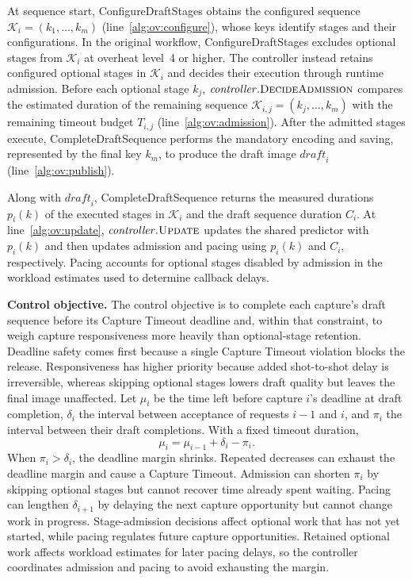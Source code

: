 

At sequence start, \textsf{ConfigureDraftStages} obtains the configured sequence \(\mathcal K_i=(k_1,\ldots,k_m)\) (line~\ref{alg:ov:configure}), whose keys identify stages and their configurations.
In the original workflow, \textsf{ConfigureDraftStages} excludes optional stages from \(\mathcal K_i\) at overheat level~4 or higher.
The controller instead retains configured optional stages in \(\mathcal K_i\) and decides their execution through runtime admission.
Before each optional stage \(k_j\), \(\mathit{controller}.\textsc{DecideAdmission}\) compares the estimated duration of the remaining sequence \(\mathcal K_{i,j}=(k_j,\ldots,k_m)\) with the remaining timeout budget \(T_{i,j}\) (line~\ref{alg:ov:admission}).
After the admitted stages execute, \textsf{CompleteDraftSequence} performs the mandatory encoding and saving, represented by the final key \(k_m\), to produce the draft image \(\mathit{draft}_i\) (line~\ref{alg:ov:publish}).

Along with \(\mathit{draft}_i\), \textsf{CompleteDraftSequence} returns the measured durations \(p_i(k)\) of the executed stages in \(\mathcal K_i\) and the draft sequence duration \(C_i\).
At line~\ref{alg:ov:update}, \(\mathit{controller}.\textsc{Update}\) updates the shared predictor with \(p_i(k)\) and then updates admission and pacing using \(p_i(k)\) and \(C_i\), respectively.
Pacing accounts for optional stages disabled by admission in the workload estimates used to determine callback delays.

\smallskip\noindent\textbf{Control objective.}
The control objective is to complete each capture's draft sequence before its Capture Timeout deadline and, within that constraint, to weigh capture responsiveness more heavily than optional-stage retention.
Deadline safety comes first because a single Capture Timeout violation blocks the release.
Responsiveness has higher priority because added shot-to-shot delay is irreversible, whereas skipping optional stages lowers draft quality but leaves the final image unaffected.
Let \(\mu_i\) be the time left before capture \(i\)'s deadline at draft completion, \(\delta_i\) the interval between acceptance of requests \(i-1\) and \(i\), and \(\pi_i\) the interval between their draft completions.
With a fixed timeout duration,
\begin{equation}
  \mu_i=\mu_{i-1}+\delta_i-\pi_i .
  \label{eq:margin-recursion}
\end{equation}
When \(\pi_i>\delta_i\), the deadline margin shrinks.
Repeated decreases can exhaust the deadline margin and cause a Capture Timeout.
Admission can shorten \(\pi_i\) by skipping optional stages but cannot recover time already spent waiting.
Pacing can lengthen \(\delta_{i+1}\) by delaying the next capture opportunity but cannot change work in progress.
Stage-admission decisions affect optional work that has not yet started, while pacing regulates future capture opportunities.
Retained optional work affects workload estimates for later pacing delays, so the controller coordinates admission and pacing to avoid exhausting the margin.

